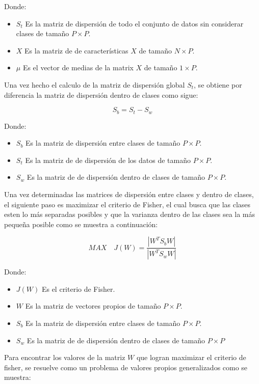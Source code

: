 \documentclass[11pt, letterpaper]{article}
\begin{document}
Donde: 
\begin{itemize}
	\item $S_t$ Es la matriz de dispersión de todo el conjunto de datos sin considerar clases de tamaño $P\times P$.
	\item $X$ Es la matriz de de características $X$ de tamaño $N \times P$.
	\item $\mu$ Es el vector de medias de la matrix $X$ de tamaño $1\times P$.
\end{itemize}

Una vez hecho el calculo de la matriz de dispersión global $S_t$, se obtiene por diferencia la matriz de dispersión dentro de clases como sigue:

$$S_b = S_t-S_w$$

Donde: 

\begin{itemize}
	\item $S_b$ Es la matriz de dispersión entre clases de tamaño $P\times P$.
	\item $S_t$ Es la matriz de de dispersión de los datos de tamaño $P \times P$.
	\item $S_w$ Es la matriz de de dispersión dentro de clases de tamaño $P \times P$.
\end{itemize}

Una vez determinadas las matrices de dispersión entre clases y dentro de clases, el siguiente paso es maximizar el criterio de Fisher, el cual busca que las clases esten lo más separadas posibles y que la varianza dentro de las clases sea la más pequeña posible como se muestra a continuación:

$$MAX \quad J(W)  = \frac{|W^TS_bW|}{|W^TS_wW|}$$

Donde: 

\begin{itemize}
	\item $J(W)$ Es el criterio de Fisher.
	\item $W$ Es la matriz de vectores propios de tamaño $P \times P$.
	\item $S_b$ Es la matriz de dispersión entre clases de tamaño $P\times P$.
	\item $S_w$ Es la matriz de de dispersión dentro de clases de tamaño $P \times P$
\end{itemize}

\newpage

Para encontrar los valores de la matriz $W$ que logran maximizar el criterio de fisher, se resuelve como un problema de valores propios generalizados como se muestra:
\end{document}
